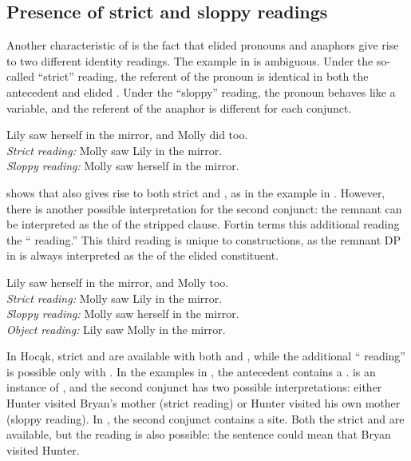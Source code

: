 \documentclass[output=paper]{LSP/langsci}
\begin{document}
\subsection{Presence of strict and sloppy readings}\label{sec:johnson:3.5}

Another characteristic of  is the fact that elided pronouns and anaphors give rise to two different identity readings. The  example in  is ambiguous. Under the so-called ``strict'' reading, the referent of the pronoun is identical in both the antecedent and elided . Under the ``sloppy'' reading, the pronoun behaves like a variable, and the referent of the anaphor is different for each conjunct.
  
\ea\label{ex:johnson:42} 
Lily saw herself in the mirror, and Molly did too.\\
\textit{Strict reading:} Molly saw Lily in the mirror.\\
\textit{Sloppy reading:} Molly saw herself in the mirror.
\z

\citealt{Fortin2007} shows that  also gives rise to both strict and , as in the example in . However, there is another possible interpretation for the second conjunct: the remnant can be interpreted as the  of the stripped clause. Fortin terms this additional reading the `` reading.'' This third reading is unique to  constructions, as the remnant DP in  is always interpreted as the  of the elided constituent. 
  
\ea\label{ex:johnson:43} 
Lily saw herself in the mirror, and Molly too.\\
\textit{Strict reading:} Molly saw Lily in the mirror.\\
\textit{Sloppy reading:} Molly saw herself in the mirror.\\
\textit{Object reading:} Lily saw Molly in the mirror.
\z

In Hocąk, strict and  are available with both  and , while the additional `` reading'' is possible only with . In the examples in , the antecedent  contains a  .  is an instance of , and the second conjunct has two possible interpretations: either Hunter visited Bryan's mother (strict reading) or Hunter visited his own mother (sloppy reading). In , the second conjunct contains a   site. Both the strict and  are available, but the  reading is also possible: the sentence could mean that Bryan visited Hunter.
 
\end{document}
